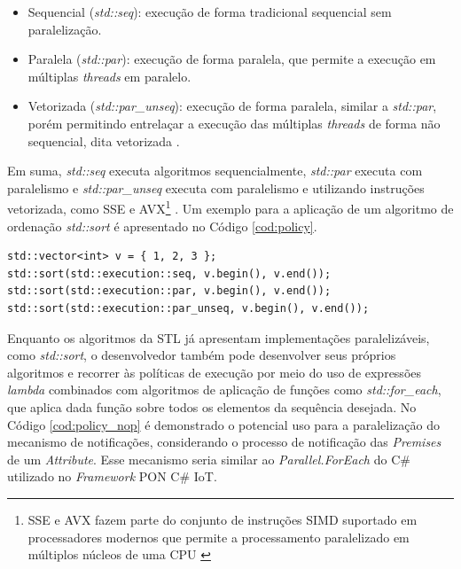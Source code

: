\begin{itemize}
  \item Sequencial (\textit{std::seq}): execução de forma tradicional sequencial
        sem paralelização.
  \item Paralela (\textit{std::par}): execução de forma paralela, que permite a
        execução em múltiplas \textit{threads} em paralelo.
  \item Vetorizada (\textit{std::par\_unseq}): execução de forma paralela,
  similar a \textit{std::par}, porém permitindo entrelaçar a execução das
  múltiplas \textit{threads} de forma não sequencial, dita vetorizada \cite{c_stories_2018}.
\end{itemize}

Em suma, \textit{std::seq} executa algoritmos sequencialmente, \textit{std::par}
executa com paralelismo e \textit{std::par\_unseq} executa com paralelismo e
utilizando instruções vetorizada, como SSE e AVX\footnote{SSE e AVX fazem parte
do conjunto de instruções SIMD suportado em processadores modernos que permite a
processamento paralelizado em múltiplos núcleos de uma CPU
\cite{jeong2012performance}} \cite{c_stories_2018}. Um exemplo para a aplicação
de um algoritmo de ordenação \textit{std::sort} é apresentado no Código
\ref{cod:policy}.

\begin{lstlisting}[caption = {Uso de políticas de execução},
source = {Autoria própria}, float=htb,
label = {cod:policy}]
std::vector<int> v = { 1, 2, 3 };
std::sort(std::execution::seq, v.begin(), v.end());
std::sort(std::execution::par, v.begin(), v.end());
std::sort(std::execution::par_unseq, v.begin(), v.end());
\end{lstlisting}

\FloatBarrier

Enquanto os algoritmos da STL já apresentam implementações paralelizáveis, como
\textit{std::sort}, o desenvolvedor também pode desenvolver seus próprios
algoritmos e recorrer às políticas de execução por meio do uso de expressões
\textit{lambda} combinados com algoritmos de aplicação de funções como
\textit{std::for\_each}, que aplica dada função sobre todos os elementos da
sequência desejada. No Código \ref{cod:policy_nop} é demonstrado o potencial uso
para a paralelização do mecanismo de notificações, considerando o processo de
notificação das \textit{Premises} de um \textit{Attribute}. Esse mecanismo seria
similar ao \textit{Parallel.ForEach} do C\# utilizado no \textit{Framework} PON
C\# IoT.

